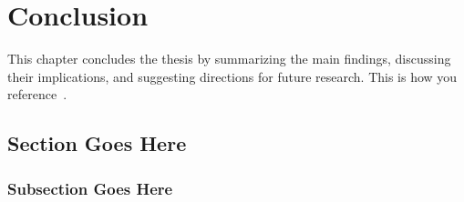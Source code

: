 \chapter{Conclusion}
\label{chap:conclusion}

This chapter concludes the thesis by summarizing the main findings, discussing their implications, and suggesting directions for future research. This is how you reference~\cite{greenwade93}.

\section{Section Goes Here}
\subsection{Subsection Goes Here}